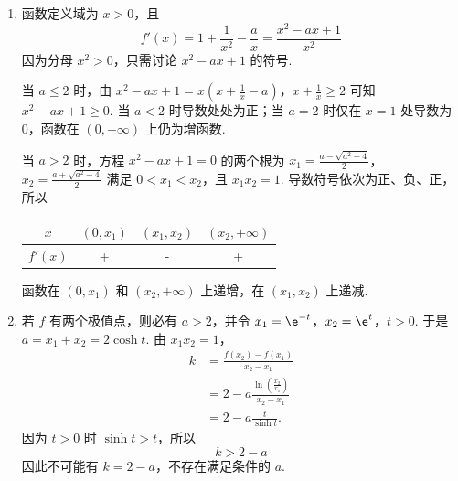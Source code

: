 \begin{solution}
\begin{enumerate}
\item
函数定义域为 \(x>0\)，且
\[
f'(x)=1+\frac1{x^2}-\frac ax
=\frac{x^2-ax+1}{x^2}
\]
因为分母 \(x^2>0\)，只需讨论
\(x^2-ax+1\) 的符号.

当 \(a\leqslant2\) 时，由
\(x^2-ax+1=x\left(x+\frac1x-a\right)\)，\(x+\frac1x\geqslant2\)
可知 \(x^2-ax+1\geqslant0\). 当 \(a<2\) 时导数处处为正；当 \(a=2\) 时仅在 \(x=1\) 处导数为 \(0\)，函数在 \((0,+\infty)\) 上仍为增函数.

当 \(a>2\) 时，方程 \(x^2-ax+1=0\) 的两个根为
\(x_1=\frac{a-\sqrt{a^2-4}}2\)，\(x_2=\frac{a+\sqrt{a^2-4}}2\)
满足 \(0<x_1<x_2\)，且 \(x_1x_2=1\). 导数符号依次为正、负、正，所以
\begin{center}
\begin{tabular}{c|ccc}
\(x\) & \((0,x_1)\) & \((x_1,x_2)\) & \((x_2,+\infty)\) \\
\hline
\(f'(x)\) & + & - & +
\end{tabular}
\end{center}
函数在 \((0,x_1)\) 和 \((x_2,+\infty)\) 上递增，在 \((x_1,x_2)\) 上递减.

\item
若 \(f\) 有两个极值点，则必有 \(a>2\)，并令
\(x_1=\e^{-t}\)，\(x_2=\e^t\)，\(t>0\).
于是 \(a=x_1+x_2=2\cosh t\). 由 \(x_1x_2=1\)，
\[
\begin{aligned}
k
&=\frac{f(x_2)-f(x_1)}{x_2-x_1}\\
&=2-a\frac{\ln(\frac{x_2}{x_1})}{x_2-x_1}\\
&=2-a\frac{t}{\sinh t}.
\end{aligned}
\]
因为 \(t>0\) 时 \(\sinh t>t\)，所以
\[
k>2-a
\]
因此不可能有 \(k=2-a\)，不存在满足条件的 \(a\).
\end{enumerate}
\end{solution}
